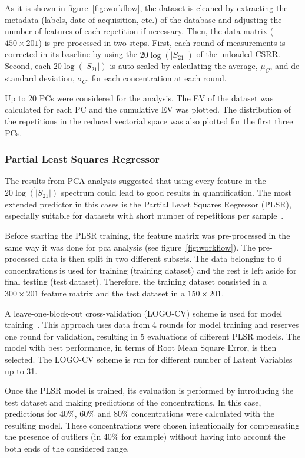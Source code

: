 \documentclass[journal,twoside,web]{ieeecolor}
\begin{document}
As it is shown in figure~\ref{fig:workflow}, the dataset is cleaned by extracting the metadata (labels, date of acquisition, etc.) of the database and adjusting the number of features of each repetition if necessary. Then, the data matrix ($450\times201$) is pre-processed in two steps. First, each round of measurements is corrected in its baseline by using the $20\dot{\log\left(|S_{21}|\right)}$ of the unloaded CSRR. Second, each $20\dot{\log\left(|S_{21}|\right)}$ is auto-scaled by calculating the average, $\mu_{C}$, and de standard deviation, $\sigma_{C}$, for each concentration at each round.

Up to $20$ PCs were considered for the analysis. The EV of the dataset was calculated for each PC and the cumulative EV was plotted. The distribution of the repetitions in the reduced vectorial space was also plotted for the first three PCs.  

\subsubsection{Partial Least Squares Regressor}
\label{sssec:pls}

The results from PCA analysis suggested that using every feature in the $20\dot{\log\left(|S_{21}|\right)}$ spectrum could lead to good results in quantification. The most extended predictor in this cases is the Partial Least Squares Regressor (PLSR), especially suitable for datasets with short number of repetitions per sample~\cite{Wold2001}.

Before starting the PLSR training, the feature matrix was pre-processed in the same way it was done for pca analysis (see figure~\ref{fig:workflow}). The pre-processed data is then split in two different subsets. The data belonging to $6$ concentrations is used for training (training dataset) and the rest is left aside for final testing (test dataset). Therefore, the training dataset consisted in a $300\times201$ feature matrix and the test dataset in a $150\times201$. 

A leave-one-block-out cross-validation (LOGO-CV) scheme is used for model training~\cite{Filzmoser2009}. This approach uses data from 4 rounds for model training and reserves one round for validation, resulting in 5 evaluations of different PLSR models. The model with best performance, in terms of Root Mean Square Error, is then selected. The LOGO-CV scheme is run for different number of Latent Variables up to 31. 

Once the PLSR model is trained, its evaluation is performed by introducing the test dataset and making predictions of the concentrations. In this case, predictions for $40\%$, $60\%$ and $80\%$ concentrations were calculated with the resulting model. These concentrations were chosen intentionally for compensating the presence of outliers (in $40\%$ for example) without having into account the both ends of the considered range.
\end{document}
